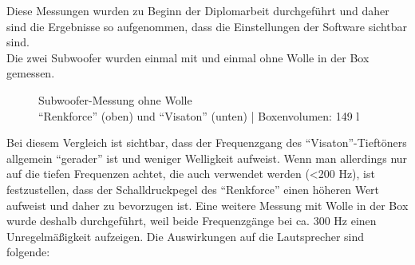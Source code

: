 \newpage
Diese Messungen wurden zu Beginn der Diplomarbeit durchgeführt und daher sind die Ergebnisse so aufgenommen, dass die Einstellungen der Software sichtbar sind.\\ %
Die zwei Subwoofer wurden einmal mit und einmal ohne Wolle in der Box gemessen. 
\begin{figure} [H]
	\centering
	\quad
	\caption{Subwoofer-Messung ohne Wolle\\ \enquote{Renkforce} (oben) und \enquote{Visaton} (unten) | Boxenvolumen: 149 l}
	\label{fig:4.2.3.2}
\end{figure}
Bei diesem Vergleich ist sichtbar, dass der Frequenzgang des \enquote{Visaton}-Tieftöners allgemein \enquote{gerader} ist und weniger Welligkeit aufweist.
Wenn man allerdings nur auf die tiefen Frequenzen achtet, die auch verwendet werden (<200 Hz), ist festzustellen, dass der Schalldruckpegel des \enquote{Renkforce} einen höheren Wert aufweist und daher zu bevorzugen ist.\newpage
Eine weitere Messung mit Wolle in der Box wurde deshalb durchgeführt, weil beide Frequenzgänge bei ca. 300 Hz einen Unregelmäßigkeit aufzeigen.
Die Auswirkungen auf die Lautsprecher sind folgende:
